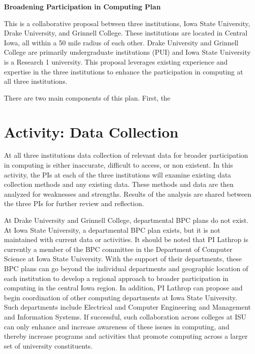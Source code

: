 \documentclass[11pt]{article}
\begin{document}
    \setcounter{page}{1}
    \begin{center}
        {\Large {\bf Broadening Participation in Computing Plan}}
    \end{center}

	This is a collaborative proposal between three institutions, Iowa State University, Drake University, and Grinnell College.  These institutions are located in Central Iowa, all within a 50 mile radius of each other.  Drake University and Grinnell College are primarily undergraduate institutions (PUI) and Iowa State University is a Research 1 university.  This proposal leverages existing experience and expertise in the three institutions to enhance the participation in computing at all three institutions.

    There are two main components of this plan.  First, the 
    

    \section{Activity: Data Collection}
    At all three institutions data collection of relevant data for broader participation in computing is either inaccurate, difficult to access, or non existent.  In this activity, the PIs at each of the three institutions will examine existing data collection methods and any existing data.  These methods and data are then analyzed for weaknesses and strengths.  Results of the analysis are shared between the three PIs for further review and reflection.    
    
    
    At Drake University and Grinnell College, departmental BPC plans do not exist.  At Iowa State University, a departmental BPC plan exists, but it is not maintained with current data or activities.  It should be noted that PI Lathrop is currently a member of the BPC committee in the Department of Computer Science at Iowa State University.  With the support of their departments, these BPC plans can go beyond the individual departments and geographic location of each institution to develop a regional approach to broader participation in computing in the central Iowa region.  In addition, PI Lathrop can propose and begin coordination of other computing departments at Iowa State University.  Such departments include Electrical and Computer Engineering and Management and Information Systems.  If successful, such collaboration across colleges at ISU can only enhance and  increase awareness of these issues in computing, and thereby increase programs and activities that promote computing across a larger set of university constituents. 
\end{document}
